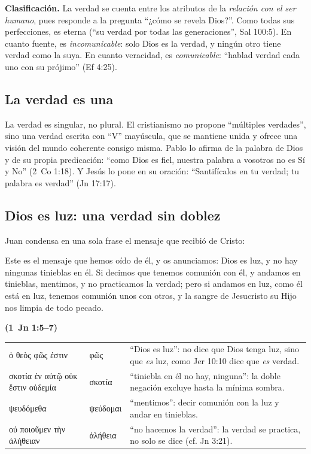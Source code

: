 \documentclass[11pt,letterpaper]{article}
\newcommand{\grc}[1]{\foreignlanguage{ancientgreek}{#1}}
\newcommand{\fuente}[1]{\par\hfill{\upshape\bfseries\small\textcolor{azul}{#1}}}
\begin{document}
\textbf{Clasificación.} La verdad se cuenta entre los atributos de la \emph{relación con el ser humano}, pues responde a la pregunta ``¿cómo se revela Dios?''. Como todas sus perfecciones, es eterna (``su verdad por todas las generaciones'', Sal 100:5). En cuanto fuente, es \emph{incomunicable}: solo Dios es la verdad, y ningún otro tiene verdad como la suya. En cuanto veracidad, es \emph{comunicable}: ``hablad verdad cada uno con su prójimo'' (Ef 4:25).

\subsection{La verdad es una}
La verdad es singular, no plural. El cristianismo no propone ``múltiples verdades'', sino una verdad escrita con ``V'' mayúscula, que se mantiene unida y ofrece una visión del mundo coherente consigo misma. Pablo lo afirma de la palabra de Dios y de su propia predicación: ``como Dios es fiel, nuestra palabra a vosotros no es Sí y No'' (2~Co 1:18). Y Jesús lo pone en su oración: ``Santifícalos en tu verdad; tu palabra es verdad'' (Jn 17:17).

\subsection{Dios es luz: una verdad sin doblez}
Juan condensa en una sola frase el mensaje que recibió de Cristo:

\begin{cita}Este es el mensaje que hemos oído de él, y os anunciamos: Dios es luz, y no hay ningunas tinieblas en él. Si decimos que tenemos comunión con él, y andamos en tinieblas, mentimos, y no practicamos la verdad; pero si andamos en luz, como él está en luz, tenemos comunión unos con otros, y la sangre de Jesucristo su Hijo nos limpia de todo pecado.\fuente{(1~Jn 1:5--7)}\end{cita}

\begin{filologia}[1 Jn 1:5--6]
\begin{tabular}{@{}L{3.2cm}L{1.6cm}L{10cm}@{}}
\grc{ὁ θεὸς φῶς ἐστιν} & \grc{φῶς} & ``Dios es luz'': no dice que Dios tenga luz, sino que \emph{es} luz, como Jer 10:10 dice que \emph{es} verdad. \\[2pt]
\grc{σκοτία ἐν αὐτῷ οὐκ ἔστιν οὐδεμία} & \grc{σκοτία} & ``tiniebla en él no hay, ninguna'': la doble negación excluye hasta la mínima sombra. \\[2pt]
\grc{ψευδόμεθα} & \grc{ψεύδομαι} & ``mentimos'': decir comunión con la luz y andar en tinieblas. \\[2pt]
\grc{οὐ ποιοῦμεν τὴν ἀλήθειαν} & \grc{ἀλήθεια} & ``no hacemos la verdad'': la verdad se practica, no solo se dice (cf. Jn 3:21). \\
\end{tabular}
\end{filologia}
\end{document}

